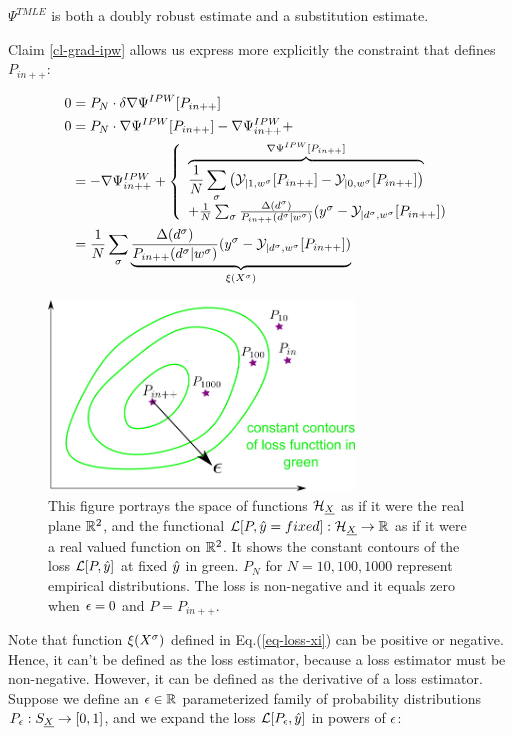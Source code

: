 $\Psi^{TMLE}$ is both
a doubly robust estimate and a substitution estimate.

Claim \ref{cl-grad-ipw} allows us
express
more explicitly the constraint that defines $P_{in++}$:

\begin{align}
0 &=
P_N\cdot\delta\nabla\Psi^{IPW}[P_{in++}]
\\
0 &=
P_N\cdot\nabla\Psi^{IPW}[P_{in++}]-\nabla\Psi^{IPW}_{in++}+
\\
&= -\nabla\Psi^{IPW}_{in++}+
\left\{
\begin{array}{l}
\overbrace{
\frac{1}{N}
\sum_\sigma
\left(
{\cal Y}_{|1,w^\sigma}[P_{in++}]
-
{\cal Y}_{|0,w^\sigma}[P_{in++}]
\right)
}^{ \nabla\Psi^{IPW}[P_{in++}]}
\\
+
\frac{1}{N}
\sum_\sigma
\frac{\Delta(d^\sigma)}{P_{in++}(d^\sigma|w^\sigma)}
(y^\sigma-{\cal Y}_{|d^\sigma,w^\sigma}[P_{in++}])
\end{array}
\right.
\\
&=
\frac{1}{N}
\sum_\sigma \underbrace{
\frac{\Delta(d^\sigma)}{P_{in++}(d^\sigma|w^\sigma)}
(y^\sigma-{\cal Y}_{|d^\sigma,w^\sigma}[P_{in++}])
}_{\xi(X^\sigma)}
\label{eq-loss-xi}
\end{align}


\begin{figure}[h!]
\centering
\includegraphics[width=3.2in]
{targeted-est/targeted-est.png}
\caption{
This figure portrays
the space of functions ${\cal H}_{\underline{X}}$
as if it were the real plane ${ \mathbb{R}}^2$,
and the functional ${\cal L}[P, {\hat{y}}=fixed]:{\cal H}_{\underline{X}}
\rightarrow{ \mathbb{R}}$
as if it were a real valued function on ${ \mathbb{R}}^2$.
It shows  the constant contours
of the loss ${\cal L}[P, {\hat{y}}]$
at fixed ${\hat{y}}$ in green.
$P_N$ for $N=10, 100, 1000$
represent empirical distributions.
The loss is non-negative and it equals
zero when $\epsilon=0$ and $P=P_{in++}$.
}
\label{fig-targeted-est}
\end{figure}

Note that function $\xi(X^\sigma)$ defined in Eq.(\ref{eq-loss-xi})
can be positive or negative. Hence,
 it can't be defined as the loss estimator,
because a loss estimator must be non-negative. However, it can be
defined as the derivative of a loss estimator. Suppose we define an $\epsilon\in{ \mathbb{R}}$
parameterized
family of probability distributions $P_\epsilon:S_{\underline{X}}\rightarrow [0,1]$,
and we expand the loss ${\cal L}[P_\epsilon, {\hat{y}}]$
in powers of $\epsilon$:

